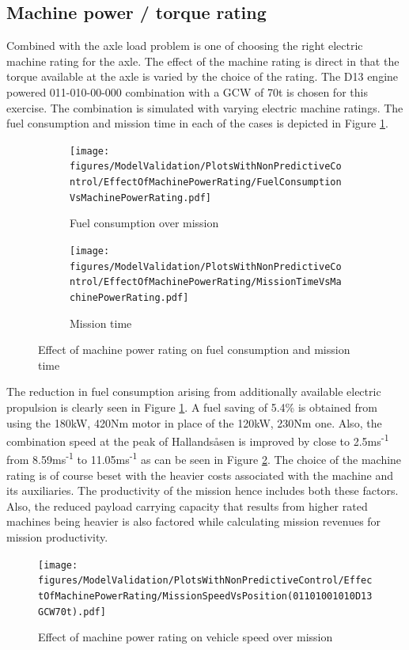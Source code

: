 \documentclass[ExampleMasters.tex]{subfiles}
\begin{document}
	\subsection{Machine power / torque rating}
	Combined with the axle load problem is one of choosing the right electric machine rating for the axle. The effect of the machine rating is direct in that the torque available at the axle is varied by the choice of the rating. The D13 engine powered 011-010-00-000 combination with a GCW of 70t is chosen for this exercise. The combination is simulated with varying electric machine ratings. The fuel consumption and mission time in each of the cases is depicted in Figure \ref{fuelTimeEngineAxleLoad}.
	\begin{figure}
	\begin{subfigure}{.5\textwidth}
	\centering
	\texttt{[image: figures/ModelValidation/PlotsWithNonPredictiveControl/EffectOfMachinePowerRating/FuelConsumptionVsMachinePowerRating.pdf]}
	\caption{Fuel consumption over mission}
	\end{subfigure}
	\begin{subfigure}{.5\textwidth}
	\centering
	\texttt{[image: figures/ModelValidation/PlotsWithNonPredictiveControl/EffectOfMachinePowerRating/MissionTimeVsMachinePowerRating.pdf]}
	\caption{Mission time}
	\end{subfigure}
	\caption{Effect of machine power rating on fuel consumption and mission time}
	\label{fuelTimeEngineAxleLoad}
	\end{figure}
	The reduction in fuel consumption arising from additionally available electric propulsion is clearly seen in Figure \ref{fuelTimeEngineAxleLoad}. A fuel saving of 5.4\% is obtained from using the 180kW, 420Nm motor in place of the 120kW, 230Nm one. Also, the combination speed at the peak of Hallands\aa sen is improved by close to 2.5ms\textsuperscript{-1} from 8.59ms\textsuperscript{-1} to 11.05ms\textsuperscript{-1} as can be seen in Figure \ref{speedMissionMachineRating}. The choice of the machine rating is of course beset with the heavier costs associated with the machine and its auxiliaries. The productivity of the mission hence includes both these factors. Also, the reduced payload carrying capacity that results from higher rated machines being heavier is also factored while calculating mission revenues for mission productivity.

	\begin{figure}
	\centering
	\texttt{[image: figures/ModelValidation/PlotsWithNonPredictiveControl/EffectOfMachinePowerRating/MissionSpeedVsPosition(01101001010D13GCW70t).pdf]}
	\caption{Effect of machine power rating on vehicle speed over mission}
	\label{speedMissionMachineRating}
	\end{figure}
\end{document}
